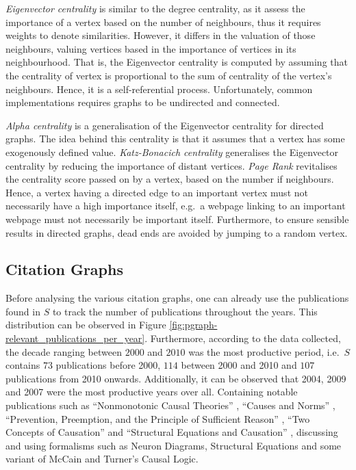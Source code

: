\documentclass[11pt,a4paper]{book}
\theoremstyle{definition}
\theoremstyle{definition}
\theoremstyle{definition}
\theoremstyle{remark}
\newcommand{\pset}{S}
\begin{document}
\emph{Eigenvector centrality} is similar to the degree centrality, as it assess the importance of a vertex based on the number of neighbours, thus it requires weights to denote similarities. However, it differs in the valuation of those neighbours, valuing vertices based in the importance of vertices in its neighbourhood. That is, the Eigenvector centrality is computed by assuming that the centrality of vertex is proportional to the sum of centrality of the vertex's neighbours. Hence, it is a self-referential process. Unfortunately, common implementations requires graphs to be undirected and connected. 
\medskip


 \emph{Alpha centrality} is a generalisation of the Eigenvector centrality for directed graphs. The idea behind this centrality is that it assumes that a vertex has some exogenously defined value. \emph{Katz-Bonacich centrality} generalises the Eigenvector centrality by reducing the importance of distant vertices. 
\emph{Page Rank} revitalises the centrality score passed on by a vertex, based on the number if neighbours. Hence, a vertex having a directed edge to an important vertex must not necessarily have a high importance itself, e.g.\ a webpage linking to an important webpage must not necessarily be important itself. Furthermore, to ensure sensible results in directed graphs, dead ends are avoided by jumping to a random vertex.

\subsection{Citation Graphs}


Before analysing the various citation graphs, one can already use the publications found in $\pset$ to track the number of publications throughout the years. This distribution can be observed in Figure \ref{fig:pgraph-relevant_publications_per_year}. 
Furthermore, according to the data collected, the decade ranging between $2000$ and $2010$ was the most productive period, i.e.\ $\pset$ contains $73$ publications before 2000, $114$ between 2000 and 2010 and $107$ publications from 2010 onwards. Additionally, it can be observed that 2004, 2009 and 2007 were the most productive years over all. Containing notable publications such as 
``Nonmonotonic Causal Theories'' \parencite{giunchiglia2004nonmonotonic}, ``Causes and Norms'' \parencite{hitchcock2009cause}, ``Prevention, Preemption, and the Principle of Sufficient Reason'' \parencite{hitchcock2007prevention}, ``Two Concepts of Causation'' \parencite{hall2004two} and ``Structural Equations and Causation'' \parencite{hall2007structural}, 
discussing and using formalisms such as Neuron Diagrams, Structural Equations and some variant of McCain and Turner's Causal Logic.
\end{document}

